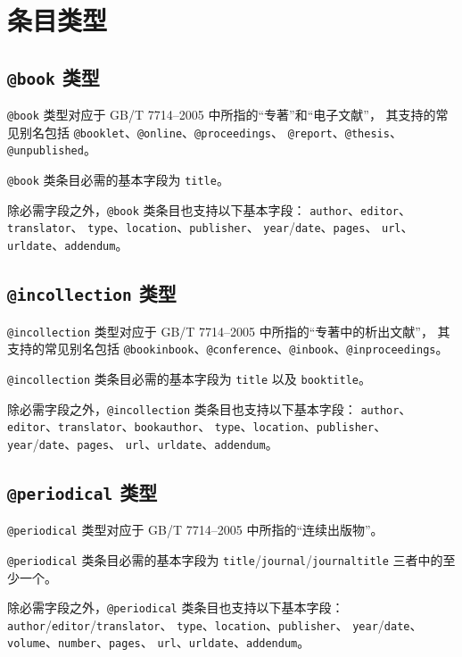 \documentclass[UTF8]{ctexart}
\begin{document}
\section{条目类型}\label{sec:entries}
\subsection{\texttt{@book} 类型}

\verb|@book| 类型对应于 GB/T 7714--2005 中所指的“专著”和“电子文献”，
其支持的常见别名包括 \verb|@booklet|、\verb|@online|、\verb|@proceedings|、%
\verb|@report|、\verb|@thesis|、\verb|@unpublished|。

\verb|@book| 类条目必需的基本字段为 \verb|title|。

除必需字段之外，\verb|@book| 类条目也支持以下基本字段：%
\verb|author|、\verb|editor|、\verb|translator|、%
\verb|type|、\verb|location|、\verb|publisher|、%
\verb|year|/\verb|date|、\verb|pages|、%
\verb|url|、\verb|urldate|、\verb|addendum|。

\subsection{\texttt{@incollection} 类型}

\verb|@incollection| 类型对应于 GB/T 7714--2005 中所指的“专著中的析出文献”，
其支持的常见别名包括
\verb|@bookinbook|、\verb|@conference|、\verb|@inbook|、\verb|@inproceedings|。

\verb|@incollection| 类条目必需的基本字段为 \verb|title| 以及 \verb|booktitle|。

除必需字段之外，\verb|@incollection| 类条目也支持以下基本字段：%
\verb|author|、\verb|editor|、\verb|translator|、\verb|bookauthor|、%
\verb|type|、\verb|location|、\verb|publisher|、%
\verb|year|/\verb|date|、\verb|pages|、%
\verb|url|、\verb|urldate|、\verb|addendum|。

\subsection{\texttt{@periodical} 类型}

\verb|@periodical| 类型对应于 GB/T 7714--2005 中所指的“连续出版物”。

\verb|@periodical| 类条目必需的基本字段为
\verb|title|/\verb|journal|/\verb|journaltitle| 三者中的至少一个。

除必需字段之外，\verb|@periodical| 类条目也支持以下基本字段：%
\verb|author|/\verb|editor|/\verb|translator|、%
\verb|type|、\verb|location|、\verb|publisher|、%
\verb|year|/\verb|date|、\verb|volume|、\verb|number|、\verb|pages|、%
\verb|url|、\verb|urldate|、\verb|addendum|。
\end{document}
